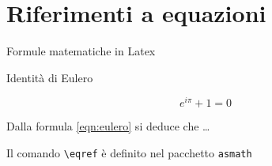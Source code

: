 \section{Riferimenti a equazioni}
  \begin{frame}{Formule matematiche in Latex}

    \begin{exampleblock}{Identità di Eulero}
      
    \end{exampleblock}

    \begin{equation}
      \label{eqn:eulero}
      e^{i\pi}+1=0
    \end{equation}

    Dalla formula \eqref{eqn:eulero} si deduce che \dots
    
    Il comando \texttt{\textbackslash eqref} è definito nel pacchetto \texttt{asmath}

\end{frame}
